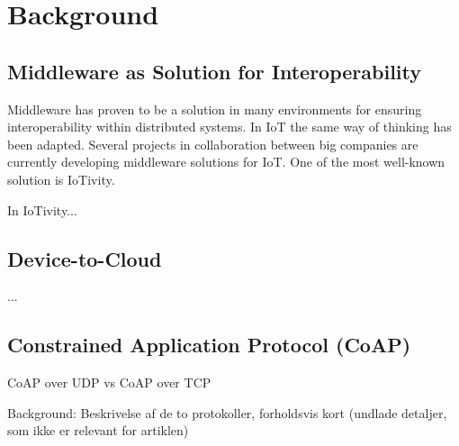 \section{Background}




\subsection{Middleware as Solution for Interoperability}
Middleware has proven to be a solution in many environments for ensuring interoperability within distributed systems. In IoT the same way of thinking has been adapted. 
Several projects in collaboration between big companies are currently developing  middleware solutions for IoT. 
One of the most well-known solution is IoTivity.
 
In \cite{interoperabilityChallenge} 
IoTivity...

\subsection{Device-to-Cloud}
...

\subsection{Constrained Application Protocol (CoAP)}
CoAP over UDP vs CoAP over TCP

Background: Beskrivelse af de to protokoller, forholdsvis kort (undlade detaljer, som ikke er relevant for artiklen)
